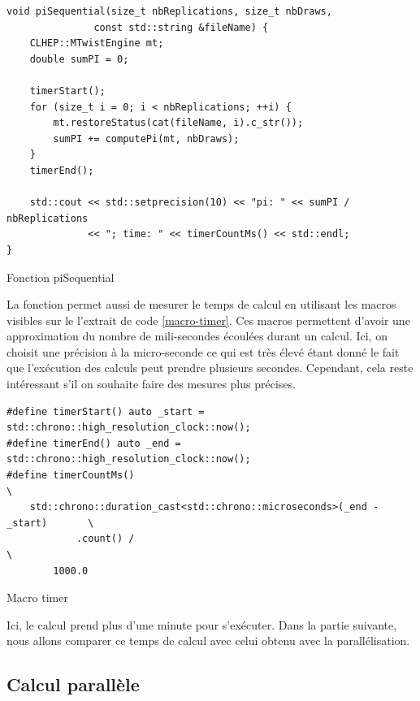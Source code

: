 \documentclass[a4paper]{article}
\begin{document}
\begin{listing}[ht!]
\begin{verbatim}
void piSequential(size_t nbReplications, size_t nbDraws,
               const std::string &fileName) {
    CLHEP::MTwistEngine mt;
    double sumPI = 0;

    timerStart();
    for (size_t i = 0; i < nbReplications; ++i) {
        mt.restoreStatus(cat(fileName, i).c_str());
        sumPI += computePi(mt, nbDraws);
    }
    timerEnd();

    std::cout << std::setprecision(10) << "pi: " << sumPI / nbReplications
              << "; time: " << timerCountMs() << std::endl;
}
\end{verbatim}
\caption{Fonction piSequential}
\label{fn-qf}
\end{listing}

La fonction permet aussi de mesurer le temps de calcul en utilisant les macros
visibles sur le l'extrait de code \ref{macro-timer}. Ces macros permettent
d'avoir une approximation du nombre de mili-secondes écoulées durant un calcul.
Ici, on choisit une précision à la micro-seconde ce qui est très élevé étant
donné le fait que l'exécution des calculs peut prendre plusieurs secondes.
Cependant, cela reste intéressant s'il on souhaite faire des mesures plus
précises.

\begin{listing}[ht!]
\begin{verbatim}
#define timerStart() auto _start = std::chrono::high_resolution_clock::now();
#define timerEnd() auto _end = std::chrono::high_resolution_clock::now();
#define timerCountMs()                                                         \
    std::chrono::duration_cast<std::chrono::microseconds>(_end - _start)       \
            .count() /                                                         \
        1000.0
\end{verbatim}
\caption{Macro timer}
\label{macro-timer}
\end{listing}

Ici, le calcul prend plus d'une minute pour s'exécuter. Dans la partie suivante,
nous allons comparer ce temps de calcul avec celui obtenu avec la
parallélisation.

\subsection{Calcul parallèle}
\end{document}
